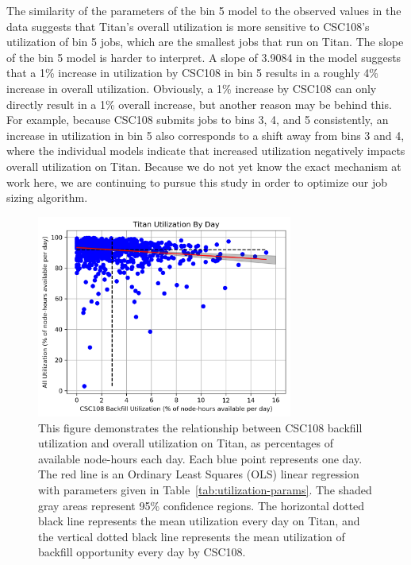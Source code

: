 The similarity of the parameters of the bin 5 model to the observed values in
the data suggests that Titan's overall utilization is more sensitive to
CSC108's utilization of bin 5 jobs, which are the smallest jobs that run on
Titan. The slope of the bin 5 model is harder to interpret. A slope of 3.9084
in the model suggests that a 1\% increase in utilization by CSC108 in bin 5
results in a roughly 4\% increase in overall utilization. Obviously, a 1\%
increase by CSC108 can only directly result in a 1\% overall increase, but
another reason may be behind this. For example, because CSC108 submits jobs to
bins 3, 4, and 5 consistently, an increase in utilization in bin 5 also
corresponds to a shift away from bins 3 and 4, where the individual models
indicate that increased utilization negatively impacts overall utilization on
Titan. Because we do not yet know the exact mechanism at work here, we are
continuing to pursue this study in order to optimize our job sizing algorithm.


\begin{figure}
  \includegraphics[width=0.75\textwidth]{images/linfit-utilization-by-true-day-all.png}
\caption{This figure demonstrates the relationship between CSC108 backfill
utilization and overall utilization on Titan, as percentages of available
node-hours each day. Each blue point represents one day. The red line is an
Ordinary Least Squares (OLS) linear regression with parameters given in
Table~\ref{tab:utilization-params}. The shaded gray areas represent 95\%
confidence regions. The horizontal dotted black line represents the mean
utilization every day on Titan, and the vertical dotted black line represents
the mean utilization of backfill opportunity every day by CSC108.}
\label{fig:utilization-all}
\end{figure}


